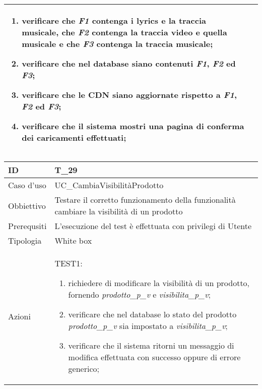 \begin{table}[hb]
\begin{tabular}{ |p{2cm}|p{10cm}|  }
\begin{enumerate}[nosep, topsep=0pt]
            \item verificare che \emph{F1} contenga i lyrics e la traccia musicale, che \emph{F2} contenga la traccia video e quella musicale e che \emph{F3} contenga la traccia musicale;
            \item verificare che nel database siano contenuti \emph{F1}, \emph{F2} ed \emph{F3};
            \item verificare che le CDN siano aggiornate rispetto a \emph{F1}, \emph{F2} ed \emph{F3};
            \item verificare che il sistema mostri una pagina di conferma dei caricamenti effettuati;
        \end{enumerate}
        \\\hline
    \end{tabular}
\end{table}

\begin{table}[hb]
    \centering
    \begin{tabular}{ |p{2cm}|p{10cm}|  }
        \hline
        ID          & T\_29                                                                                      \\\hline
        Caso d'uso  & UC\_CambiaVisibilitàProdotto                                                               \\\hline
        Obbiettivo  & Testare il corretto funzionamento della funzionalità cambiare la visibilità di un prodotto \\\hline
        Prerequsiti & L'esecuzione del test è effettuata con privilegi di Utente                                 \\\hline
        Tipologia   & White box                                                                                  \\\hline
        Azioni      &
        TEST1:
        \begin{enumerate}[nosep, topsep=0pt]
            \item richiedere di modificare la visibilità di un prodotto, fornendo \emph{prodotto\_p\_v} e \emph{visibilita\_p\_v};
            \item verificare che nel database lo stato del prodotto \emph{prodotto\_p\_v} sia impostato a \emph{visibilita\_p\_v};
            \item verificare che il sistema ritorni un messaggio di modifica effettuata con successo oppure di errore generico;
        \end{enumerate}
        \\\hline
    \end{tabular}
\end{table}

